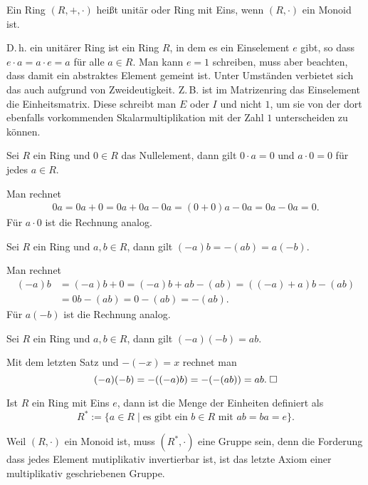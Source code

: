\begin{Definition}\newlinefirst
Ein Ring $(R,+,\cdot)$ heißt unitär oder Ring mit Eins, wenn
$(R,\cdot)$ ein Monoid ist.
\end{Definition}
D.\,h. ein unitärer Ring ist ein Ring $R$, in dem es ein Einselement
$e$ gibt, so dass $e\cdot a=a\cdot e=a$ für alle $a\in R$. Man kann
$e=1$ schreiben, muss aber beachten, dass damit ein abstraktes Element
gemeint ist. Unter Umständen verbietet sich das auch aufgrund von
Zweideutigkeit. Z.\,B. ist im Matrizenring das Einselement die
Einheitsmatrix. Diese schreibt man $E$ oder $I$ und nicht $1$, um sie
von der dort ebenfalls vorkommenden Skalarmultiplikation mit der
Zahl $1$ unterscheiden zu können.

\begin{Satz}
Sei $R$ ein Ring und $0\in R$ das Nullelement, dann gilt
$0\cdot a = 0$ und $a\cdot 0 = 0$ für jedes $a\in R$.
\end{Satz}
 Man rechnet
\begin{align*}
0a = 0a+0 = 0a+0a-0a = (0+0)a-0a = 0a-0a = 0.
\end{align*}
Für $a\cdot 0$ ist die Rechnung analog.\;\qedsymbol

\begin{Satz}
Sei $R$ ein Ring und $a,b\in R$, dann gilt $(-a)b = -(ab) = a(-b)$.
\end{Satz}
 Man rechnet
\begin{align*}
(-a)b &= (-a)b+0 = (-a)b+ab-(ab) = ((-a)+a)b-(ab)\\
&= 0b-(ab) = 0-(ab) = -(ab).
\end{align*}
Für $a(-b)$ ist die Rechnung analog.\;\qedsymbol
\begin{Satz}
Sei $R$ ein Ring und $a,b\in R$, dann gilt $(-a)(-b)=ab$.
\end{Satz}
 Mit dem letzten Satz und $-(-x)=x$ rechnet man
\[(-a)(-b) = -((-a)b) = -(-(ab)) = ab.\;\Box\]

\begin{Definition}[Einheitengruppe]\newlinefirst
Ist $R$ ein Ring mit Eins $e$, dann ist die Menge der Einheiten definiert als
\[R^* := \{a\in R\mid \text{es gibt ein $b\in R$ mit $ab=ba=e$}\}.\]
\end{Definition}
Weil $(R,\cdot)$ ein Monoid ist, muss $(R^*,\cdot)$ eine Gruppe sein,
denn die Forderung dass jedes Element mutiplikativ invertierbar ist,
ist das letzte Axiom einer multiplikativ geschriebenen Gruppe.

